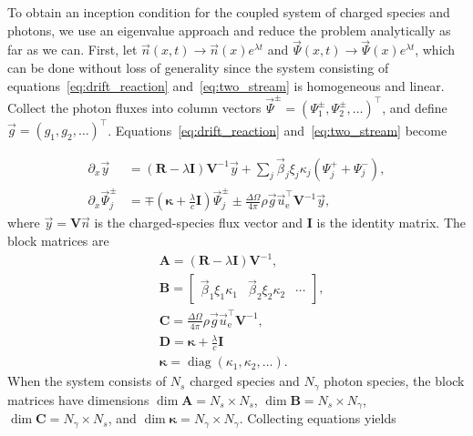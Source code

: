 \documentclass{iopjournal}
\newcommand{\e}{\ensuremath{\text{e}}}
\DeclareMathOperator\diag{diag}
\begin{document}
To obtain an inception condition for the coupled system of charged species and photons, we use an eigenvalue approach \cite{Ferreira2019} and reduce the problem analytically as far as we can.
First, let $\vec{n}(x,t)\rightarrow\vec{n}(x)e^{\lambda t}$ and $\vec{\Psi}(x,t) \rightarrow \vec{\Psi}(x)e^{\lambda t}$, which can be done without loss of generality since the system consisting of equations~\eqref{eq:drift_reaction} and~\eqref{eq:two_stream} is homogeneous and linear.
Collect the photon fluxes into column vectors $\vec{\Psi}^\pm = (\Psi_1^\pm,\Psi_2^\pm,\ldots)^\intercal$, and define $\vec{g} = \left(g_1, g_2, \ldots\right)^\intercal$.
Equations~\eqref{eq:drift_reaction} and~\eqref{eq:two_stream} become

\begin{align}
  \partial_x\vec{y} &= \left(\bm{R}-\lambda\bm{I}\right)\bm{V}^{-1}\vec{y} + \sum_j\vec{\beta}_j\xi_j\kappa_j\left(\Psi_j^+ + \Psi_j^-\right),\\
  \partial_x\vec{\Psi}_j^\pm &= \mp\left(\bm{\kappa}+\frac{\lambda}{c}\bm{I}\right)\vec{\Psi}_j^\pm \pm \frac{\Delta\Omega}{4\pi}\rho\vec{g}\vec{u}_\e^\intercal \bm{V}^{-1}\vec{y},
\end{align}
where $\vec{y} = \bm{V}\vec{n}$ is the charged-species flux vector and $\bm{I}$ is the identity matrix.
The block matrices are
\begin{align}
  &\bm{A} = \left(\bm{R}-\lambda\bm{I}\right)\bm{V}^{-1},\\
  &\bm{B} = \begin{bmatrix}\vec{\beta}_1\xi_1\kappa_1 & \vec{\beta}_2\xi_2\kappa_2 & \cdots\end{bmatrix},\\
    &\bm{C} = \frac{\Delta\Omega}{4\pi}\rho\vec{g}\vec{u}_\e^\intercal\bm{V}^{-1},\\
    &\bm{D} = \bm{\kappa} + \frac{\lambda}{c}\bm{I}\\
    &\bm{\kappa} = \diag(\kappa_1, \kappa_2, \ldots).
\end{align}
When the system consists of $N_s$ charged species and $N_\gamma$ photon species, the block matrices have dimensions $\dim \bm{A} = N_s\times N_s$, $\dim \bm{B} = N_s\times N_\gamma$, $\dim \bm{C}= N_\gamma\times N_s$, and $\dim\bm{\kappa} = N_\gamma\times N_\gamma$.
Collecting equations yields
\end{document}
